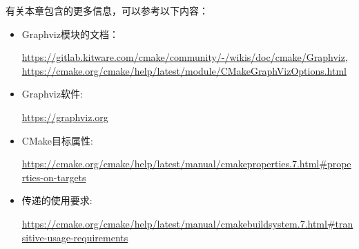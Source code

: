 有关本章包含的更多信息，可以参考以下内容：

\begin{itemize}
\item
Graphviz模块的文档：

\url{https://gitlab.kitware.com/cmake/community/-/wikis/doc/cmake/Graphviz}, \url{https://cmake.org/cmake/help/latest/module/CMakeGraphVizOptions.html}

\item
Graphviz软件:

\url{https://graphviz.org}

\item
CMake目标属性:

\url{https://cmake.org/cmake/help/latest/manual/cmakeproperties.7.html#properties-on-targets}

\item
传递的使用要求:

\url{https://cmake.org/cmake/help/latest/manual/cmakebuildsystem.7.html#transitive-usage-requirements}
\end{itemize}





















